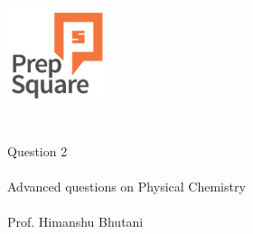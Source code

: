 \documentclass{beamer}
\begin{document}
\begin{center}
\ \\ \ \\
\includegraphics[width=30mm]{Logo-final.png} \\
\ \\ \ \\ 
{\huge Question 2 \\ \ \\ }
{\Large
Advanced questions on Physical Chemistry
}
{\large \ \\ \ \\ Prof. Himanshu Bhutani }
\end{center}
\end{document}
